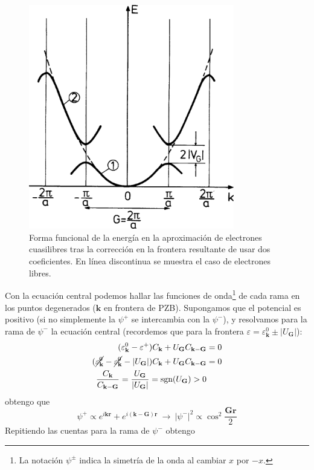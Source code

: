 \begin{figure}
  \centering
  \includegraphics[width=0.8\textwidth]{figures/energygap.png}
  \caption{Forma funcional de la energía en la aproximación de
    electrones cuasilibres tras la corrección en la frontera
    resultante de usar dos coeficientes. En línea discontinua se muestra el caso de
  electrones libres.}
  \label{fig:energygap}
\end{figure}

Con la ecuación central podemos hallar las funciones de
onda\footnote{La notación $\psi^\pm$ indica la simetría de la onda al
  cambiar $x$ por $-x$.} de cada
rama en los puntos degenerados ($\mathbf{k}$ en frontera de
PZB). Supongamos que el potencial es positivo (si no simplemente la
$\psi^+$ se intercambia con la $\psi^-$), y resolvamos para la rama
de $\psi^-$ la ecuación central (recordemos que para la frontera
$\varepsilon = \varepsilon_\mathbf{k}^0 \pm |U_\mathbf{G}|$):
\begin{equation}
  \begin{split}
    (\varepsilon_\mathbf{k}^0 - \varepsilon^+) C_\mathbf{k} +
    U_\mathbf{G} C_{\mathbf{k}-\mathbf{G}} &= 0 \\
    ( \cancel{\varepsilon_\mathbf{k}^0}-  \cancel{\varepsilon_\mathbf{k}^0}- |U_\mathbf{G}|) C_\mathbf{k} +
    U_\mathbf{G} C_{\mathbf{k}-\mathbf{G}} &= 0 \\
\frac{C_\mathbf{k}}{C_{\mathbf{k}-\mathbf{G}}} =
\frac{U_\mathbf{G}}{|U_\mathbf{G}|} = \text{sgn} (U_\mathbf{G}) > 0
  \end{split}
\end{equation}
obtengo que
\begin{equation}
  \psi^+ \propto e^{i \mathbf{k}\mathbf{r}} + e^{i
    (\mathbf{k}-\mathbf{G}) \mathbf{r}} \ \rightarrow \ |\psi^-|^2
  \propto \cos^2 \frac{\mathbf{G}\mathbf{r}}{2} \tag{S wave}
\end{equation}
Repitiendo las cuentas para la rama de $\psi^-$ obtengo

